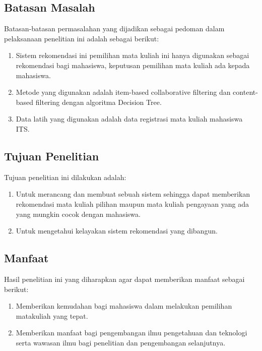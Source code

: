 \subsection{Batasan Masalah}
Batasan-batasan permasalahan yang dijadikan sebagai pedoman dalam pelaksanaan penelitian ini adalah sebagai berikut:
\begin{enumerate}[noitemsep]
      \item Sistem rekomendasi ini pemilihan mata kuliah
            ini hanya digunakan sebagai rekomendasi bagi
            mahasiswa, keputusan pemilihan mata kuliah
            ada kepada mahasiswa.
      \item Metode yang digunakan adalah item-based
            collaborative filtering dan content-based
            filtering dengan algoritma Decision Tree.
      \item Data latih yang digunakan adalah data registrasi mata kuliah mahasiswa ITS.
\end{enumerate}

\subsection{Tujuan Penelitian}
Tujuan penelitian ini dilakukan adalah:
\begin{enumerate}[noitemsep]
      \item Untuk merancang dan membuat sebuah sistem sehingga dapat memberikan rekomendasi mata kuliah pilihan
            maupun mata kuliah pengayaan yang ada yang mungkin cocok dengan mahasiswa.
      \item Untuk
            mengetahui kelayakan sistem rekomendasi yang dibangun.
\end{enumerate}

\subsection{Manfaat}
Hasil penelitian ini yang diharapkan agar dapat memberikan manfaat sebagai berikut:
\begin{enumerate}[noitemsep]
      \item Memberikan kemudahan bagi mahasiswa dalam melakukan pemilihan matakuliah yang tepat.
      \item Memberikan manfaat bagi pengembangan ilmu pengetahuan dan teknologi serta wawasan ilmu bagi
            penelitian dan pengembangan selanjutnya.
\end{enumerate}